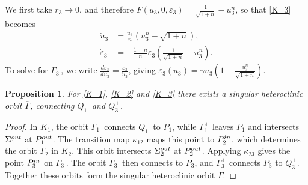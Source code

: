 \documentclass[10pt,a4paper]{amsart}
\newtheorem{prop}{Proposition}
\begin{document}
We first take $r_3\to0$, and therefore $F(u_3,0, \varepsilon_3)=\tfrac{1}{\sqrt{1+n}}-u_3^n$, so that \eqref{K_3} becomes
\begin{equation}
    \begin{aligned}
        \dot{u}_3&=\tfrac{u_3}{n}\left(u_3^n-\sqrt{1+n}\right),\\
        \dot{\varepsilon}_3&=-\tfrac{1+n}{n}\varepsilon_3\left(\tfrac{1}{\sqrt{1+n}}-u_3^n\right).
        \label{K_3 r_3=0}
    \end{aligned}
\end{equation}
To solve for $\Gamma_3^-$, we write $\tfrac{d\varepsilon_3}{du_3}=\tfrac{\dot{\varepsilon}_3}{\dot{u}_3}$, giving $\varepsilon_3(u_3)=\gamma u_3\left(1-\tfrac{u_3^n}{\sqrt{1+n}}\right)$.

\begin{prop}
    For \eqref{K_1}, \eqref{K_2} and \eqref{K_3} there exists a singular heteroclinic orbit $\overline{\Gamma}$, connecting $Q_1^-$ and $Q_3^+$.
\end{prop}

\begin{proof}
In $K_1$, the orbit $\Gamma_1^-$ connects $Q_1^-$ to $P_1$, while $\Gamma_1^+$ leaves $P_1$ and intersects $\Sigma_1^{\rm out}$ at $P_1^{\rm out}$. The transition map $\kappa_{12}$ maps this point to
$P_2^{\rm in}$, which determines the orbit $\Gamma_2$ in $K_2$. This orbit intersects $\Sigma_2^{\rm out}$ at $P_2^{\rm out}$. Applying $\kappa_{23}$ gives the point $P_3^{\rm in}$ on $\Gamma_3^-$. The orbit $\Gamma_3^-$ then connects to
$P_3$, and $\Gamma_3^+$ connects $P_3$ to $Q_3^+$. Together these orbits form the singular heteroclinic orbit $\overline{\Gamma}$.
\end{proof}
\end{document}
